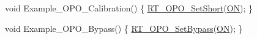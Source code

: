\begin{DoxyCode}
\textcolor{keywordtype}{void} Example\_OPO\_Calibration()
\{
    \mbox{\hyperlink{a00002_aef61e41bd9fb19c3690ff5a25fb9893d}{RT\_OPO\_SetShort}}(\mbox{\hyperlink{a00020_ad76d1750a6cdeebd506bfcd6752554d2}{ON}});
\}

\textcolor{keywordtype}{void} Example\_OPO\_Bypass()
\{
    \mbox{\hyperlink{a00002_a3297280ab870eae12b918351e111819a}{RT\_OPO\_SetBypass}}(\mbox{\hyperlink{a00020_ad76d1750a6cdeebd506bfcd6752554d2}{ON}});
\}
\end{DoxyCode}
 